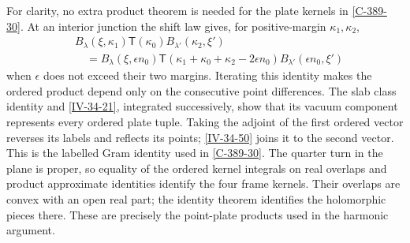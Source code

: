 \documentclass[11pt,letterpaper,reqno]{amsart}
\theoremstyle{definition}
\theoremstyle{remark}
\begin{document}
For clarity, no extra product theorem is needed for the
plate kernels in \cref{C-389-30}. At an interior junction
the shift law gives, for positive-margin $\kappa_1,\kappa_2$,
\begin{equation}\label{IV-34-50}
 \begin{split}
 &B_\lambda(\xi,\kappa_1)\mathsf T(\kappa_0)
                                  B_{\lambda'}(\kappa_2,\xi')\\
 &\quad=B_\lambda(\xi,\epsilon n_0)
   \mathsf T(\kappa_1+\kappa_0+\kappa_2-2\epsilon n_0)
                                  B_{\lambda'}(\epsilon n_0,\xi')
 \end{split}
\end{equation}
when $\epsilon$ does not exceed their two margins.
Iterating this identity makes the ordered product depend
only on the consecutive point differences. The slab class
identity and \eqref{IV-34-21}, integrated successively,
show that its vacuum component represents every ordered
plate tuple. Taking the adjoint of the first ordered
vector reverses its labels and reflects its points;
\eqref{IV-34-50} joins it to the second vector. This is
the labelled Gram identity used in \cref{C-389-30}.
The quarter turn in the plane is proper, so equality
of the ordered kernel integrals on real overlaps and
product approximate identities identify the four
frame kernels. Their overlaps are convex with an open
real part; the identity theorem identifies the
holomorphic pieces there. These are precisely the
point-plate products used in the harmonic argument.
\end{document}
